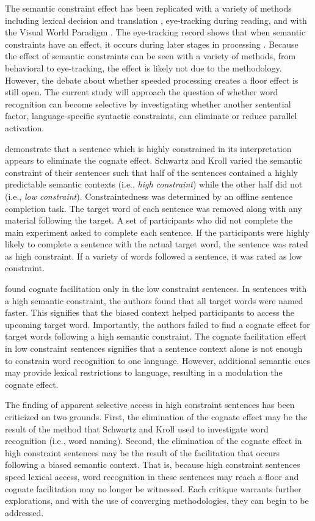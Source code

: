 The semantic constraint effect has been replicated with a variety of methods including lexical decision and translation \parencite[][]{VanHell2008}, eye-tracking during reading, and with the Visual World Paradigm \parencite[][]{Chambers2009,Libben2009}. The eye-tracking record shows that when semantic constraints have an effect, it occurs during later stages in processing \parencite[][]{Libben2009}. Because the effect of semantic constraints can be seen with a variety of methods, from behavioral to eye-tracking, the effect is likely not due to the methodology. However, the debate about whether speeded processing creates a floor effect is still open. The current study will approach the question of whether word recognition can become selective by investigating whether another sentential factor, language-specific syntactic constraints, can eliminate or reduce parallel activation. 

\textcite{Schwartz2006} demonstrate that a sentence which is highly constrained in its interpretation appears to eliminate the cognate effect. Schwartz and Kroll varied the semantic constraint of their sentences such that half of the sentences contained a highly predictable semantic contexts (i.e., \textit{high constraint}) while the other half did not (i.e., \textit{low constraint}). Constraintedness was determined by an offline sentence completion task. The target word of each sentence was removed along with any material following the target. A set of participants who did not complete the main experiment  asked to complete each sentence. If the participants were highly likely to complete a sentence with the actual target word, the sentence was rated as high constraint. If a variety of words followed a sentence, it was rated as low constraint. 

\textcite{Schwartz2006} found cognate facilitation only in the low constraint sentences. In sentences with a high semantic constraint, the authors found that all target words were named faster. This signifies that the biased context helped participants to access the upcoming target word. Importantly, the authors failed to find a cognate effect for target words following a high semantic constraint.  The cognate facilitation effect in low constraint sentences signifies that a sentence context alone is not enough to constrain word recognition to one language. However, additional semantic cues may provide lexical restrictions to language, resulting in a modulation the cognate effect. 

The finding of apparent selective access in high constraint sentences has been criticized on two grounds. First,  the elimination of the cognate effect may be the result of the method that Schwartz and Kroll used to investigate word recognition (i.e., word naming). Second, the elimination of the cognate effect in high constraint sentences may be the result of the facilitation that occurs following a biased semantic context. That is, because high constraint sentences speed lexical access, word recognition in these sentences may reach a floor and  cognate facilitation may no longer be witnessed. Each critique warrants further explorations, and with the use of converging methodologies, they can begin to be addressed. 

